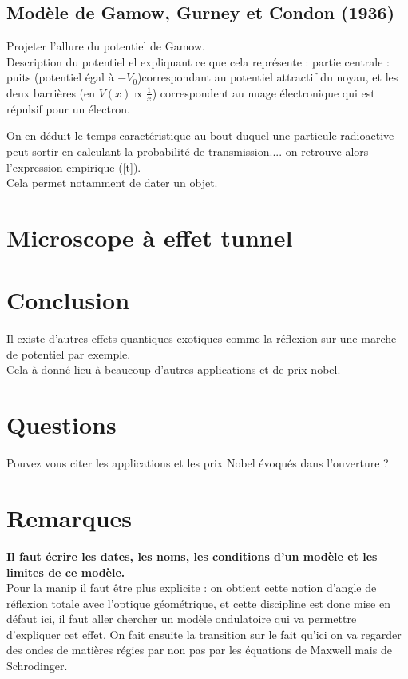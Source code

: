 \documentclass[12pt,prb,aps,epsf]{article}
\begin{document}
\subsection{Modèle de Gamow, Gurney et Condon (1936)}
Projeter l'allure du potentiel de Gamow.\\
Description du potentiel el expliquant ce que cela représente : partie centrale : puits (potentiel égal à $-V_0$)correspondant au potentiel attractif du noyau, et les deux barrières (en $V(x) \propto \frac{1}{x}$) correspondent au nuage électronique qui est répulsif pour un électron.

On en déduit le temps caractéristique au bout duquel une particule radioactive peut sortir en calculant la probabilité de transmission.... on retrouve alors l'expression empirique (\ref{t}).\\

Cela permet notamment de dater un objet.

\section{Microscope à effet tunnel}


\section{Conclusion}
Il existe d'autres effets quantiques exotiques comme la réflexion sur une marche de potentiel par exemple.\\
Cela à donné lieu à beaucoup d'autres applications et de prix nobel.

\section*{Questions}
Pouvez vous citer les applications et les prix Nobel évoqués dans l'ouverture ?


\section*{Remarques}
\textbf{Il faut écrire les dates, les noms, les conditions d'un modèle et les limites de ce modèle.}\\

Pour la manip il faut être plus explicite : on obtient cette notion d'angle de réflexion totale avec l'optique géométrique, et cette discipline est donc mise en défaut ici, il faut aller chercher un modèle ondulatoire qui va permettre d'expliquer cet effet. On fait ensuite la transition sur le fait qu'ici on va regarder des ondes de matières régies par non pas par les équations de Maxwell mais de Schrodinger.\\
\end{document}
